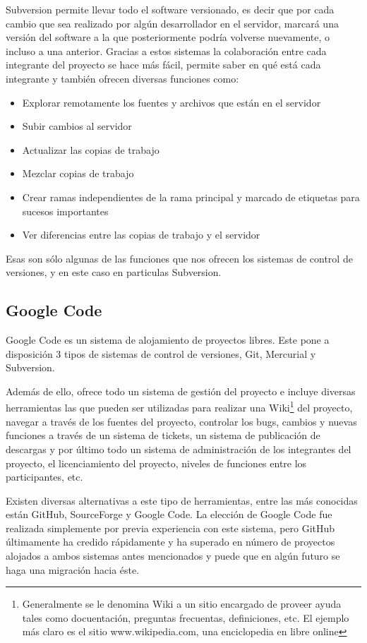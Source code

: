 \documentclass[a4paper,12pt,openany,oneside]{book}
\begin{document}
Subversion permite llevar todo el software versionado, es decir que por cada cambio que sea realizado por algún desarrollador en el servidor, marcará una versión del software a la que posteriormente podría volverse nuevamente, o incluso a una anterior. Gracias a estos sistemas la colaboración entre cada integrante del proyecto se hace más fácil, permite saber en qué está cada integrante y también ofrecen diversas funciones como:
\begin{itemize}
\item Explorar remotamente los fuentes y archivos que están en el servidor
\item Subir cambios al servidor
\item Actualizar las copias de trabajo
\item Mezclar copias de trabajo
\item Crear ramas independientes de la rama principal y marcado de etiquetas para sucesos importantes
\item Ver diferencias entre las copias de trabajo y el servidor
\end{itemize}
Esas son sólo algunas de las funciones que nos ofrecen los sistemas de control de versiones, y en este caso en particulas Subversion.
\subsection{Google Code}
Google Code es un sistema de alojamiento de proyectos libres. Este pone a disposición 3 tipos de sistemas de control de versiones, Git, Mercurial y Subversion. 

Además de ello, ofrece todo un sistema de gestión del proyecto e incluye diversas herramientas las que pueden ser utilizadas para realizar una Wiki\footnote{Generalmente se le denomina Wiki a un sitio encargado de proveer ayuda tales como docuentación, preguntas frecuentas, definiciones, etc. El ejemplo más claro es el sitio www.wikipedia.com, una enciclopedia en libre online} del proyecto, navegar a través de los fuentes del proyecto, controlar los bugs, cambios y nuevas funciones a través de un sistema de tickets, un sistema de publicación de descargas y por último todo un sistema de administración de los integrantes del proyecto, el licenciamiento del proyecto, niveles de funciones entre los participantes, etc.

Existen diversas alternativas a este tipo de herramientas, entre las más conocidas están GitHub, SourceForge y Google Code. La elección de Google Code fue realizada simplemente por previa experiencia con este sistema, pero GitHub últimamente ha credido rápidamente y ha superado en número de proyectos alojados a ambos sistemas antes mencionados y puede que en algún futuro se haga una migración hacia éste.
\end{document}
